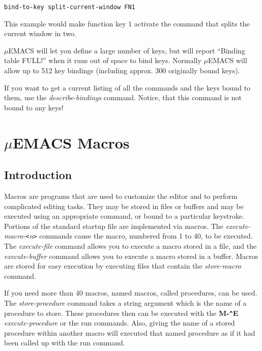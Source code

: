 \begin{verbatim}
bind-to-key split-current-window FN1
\end{verbatim}

This example would make function key 1 activate the command that splits
the current window in two.

$\mu$EMACS will let you define a large number of keys, but will report
``Binding table FULL!'' when it runs out of space to bind keys. Normally
$\mu$EMACS will allow up to 512 key bindings (including approx. 300
originally bound keys).

If you want to get a current listing of all the commands and the keys
bound to them, use the {\it describe-bindings} command. Notice, that
this command is not bound to any keys!


\chapter{$\mu$EMACS Macros}

\section{Introduction}

Macros are programs that are used to customize the editor and to
perform complicated editing tasks. They may be stored in files or
buffers and may be executed using an appropriate command, or bound to a
particular keystroke. Portions of the standard startup file are
implemented via macros. The {\it execute-macro-\verb+<+n\verb+>+}
commands cause the macro, numbered from 1 to 40, to be executed. The
{\it execute-file} command allows you to execute a macro stored in a
file, and the {\it execute-buffer} command allows you to execute a
macro stored in a buffer. Macros are stored for easy execution by
executing files that contain the {\it store-macro} command.

If you need more than 40 macros, named macros, called procedures, can
be used. The {\it store-procedure} command takes a string argument
which is the name of a procedure to store. These procedures then can be
executed with the {\bf M-\verb+^+E} {\it execute-procedure} or the run
commands. Also, giving the name of a stored procedure within another
macro will executed that named procedure as if it had been called up
with the run command.


